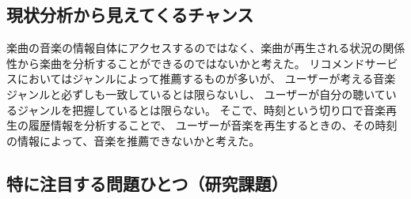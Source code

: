 \documentclass[11pt, twocolumn]{jsarticle}
\begin{document}
\subsection{現状分析から見えてくるチャンス}
楽曲の音楽の情報自体にアクセスするのではなく、楽曲が再生される状況の関係性から楽曲を分析することができるのではないかと考えた。
リコメンドサービスにおいてはジャンルによって推薦するものが多いが、
ユーザーが考える音楽ジャンルと必ずしも一致しているとは限らないし、
ユーザーが自分の聴いているジャンルを把握しているとは限らない。
そこで、時刻という切り口で音楽再生の履歴情報を分析することで、
ユーザーが音楽を再生するときの、その時刻の情報によって、音楽を推薦できないかと考えた。

\subsection{特に注目する問題ひとつ（研究課題）}
\end{document}
